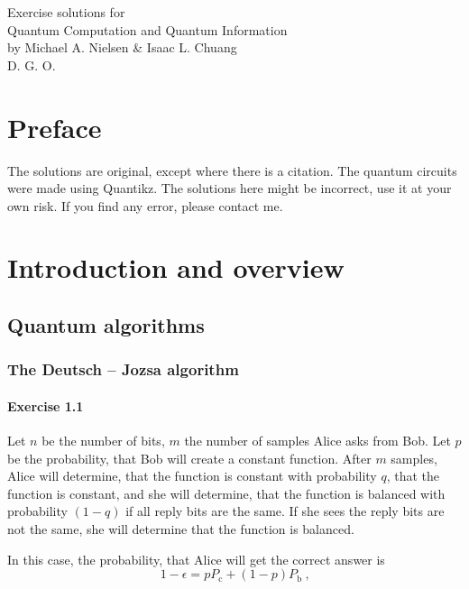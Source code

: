 \documentclass[a4paper,12pt]{article}
\newcommand{\exercise}[1]{\paragraph{Exercise #1}}
\begin{document}
    \begin{titlepage}
        \begin{center}
            \large Exercise solutions for\\ Quantum Computation and Quantum Information\\
            by Michael A. Nielsen \& Isaac L. Chuang\\[1.5cm]
            D. G. O.
        \end{center}
    \end{titlepage}

    \newpage

    \section*{Preface}

    The solutions are original, except where there is a citation. The quantum circuits were made using Quantikz\cite{kay2018tutorial}. The solutions here might be incorrect, use it at your own risk. If you find any error, please contact me.

    \newpage

    \section{Introduction and overview}

    \setcounter{subsection}{3}
    \subsection{Quantum algorithms}

    \setcounter{subsubsection}{3}
    \subsubsection{The Deutsch -- Jozsa algorithm}

    \exercise{1.1}

    Let $n$ be the number of bits, $m$ the number of samples Alice asks from Bob. Let $p$ be the probability, that Bob will create a constant function. After $m$ samples, Alice will determine, that the function is constant with probability $q$, that the function is constant, and she will determine, that the function is balanced with probability $(1 - q)$ if all reply bits are the same. If she sees the reply bits are not the same, she will determine that the function is balanced.

    In this case, the probability, that Alice will get the correct answer is
    \begin{equation}
      1 - \epsilon = p P_{\textrm{c}} + (1 - p) P_{\textrm{b}}\ \textrm{,}
    \end{equation}
\end{document}
